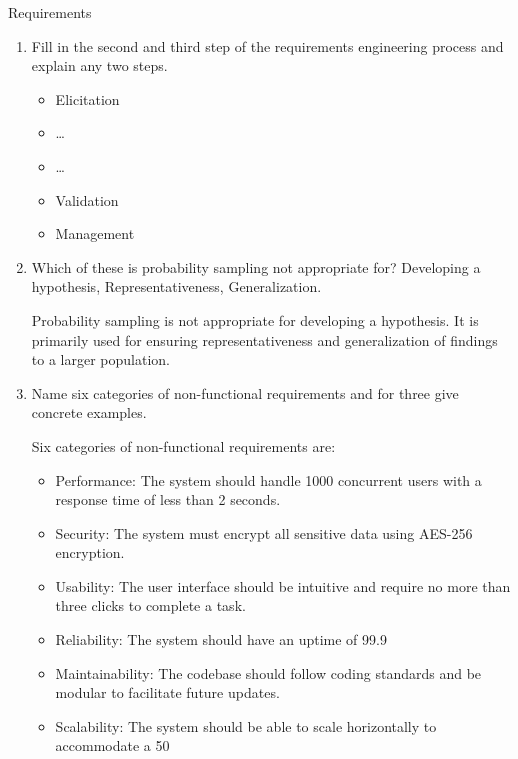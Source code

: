\documentclass{article}
\begin{document}
\begin{exercise}{Requirements}
  \begin{enumerate}
    \item Fill in the second and third step of the requirements engineering process and explain any two steps.
      \begin{itemize}
        \item Elicitation 
        \item … 
        \item … 
        \item Validation 
        \item Management 
      \end{itemize}

    \item Which of these is probability sampling not appropriate for? Developing a hypothesis, Representativeness, Generalization. \begin{solution}
        Probability sampling is not appropriate for developing a hypothesis. It is primarily used for ensuring representativeness and generalization of findings to a larger population.
      \end{solution}

    \item Name six categories of non-functional requirements and for three give concrete examples. \begin{solution}
        Six categories of non-functional requirements are:
        \begin{itemize}
          \item Performance: The system should handle 1000 concurrent users with a response time of less than 2 seconds.
          \item Security: The system must encrypt all sensitive data using AES-256 encryption.
          \item Usability: The user interface should be intuitive and require no more than three clicks to complete a task.
          \item Reliability: The system should have an uptime of 99.9%
          \item Maintainability: The codebase should follow coding standards and be modular to facilitate future updates.
          \item Scalability: The system should be able to scale horizontally to accommodate a 50%
        \end{itemize}
      \end{solution}


\end{enumerate}
\end{exercise}
\end{document}
